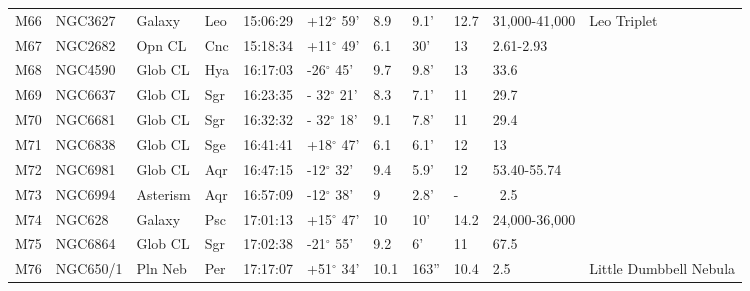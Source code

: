 \documentclass[10pt,twoside,a4paper,english]{article}
\begin{document}
\begin{longtable}{@{}lllllllllll@{}}
M66        & NGC3627     & Galaxy     & Leo       & 15:06:29 & +12$^{\circ}$ 59'  & 8.9       & 9.1'                 & 12.7     & 31,000-41,000       & Leo Triplet                               \\ 
M67        & NGC2682     & Opn CL     & Cnc       & 15:18:34 & +11$^{\circ}$ 49'  & 6.1       & 30'                  & 13       & 2.61-2.93           &                                           \\ 
M68        & NGC4590     & Glob CL    & Hya       & 16:17:03 & -26$^{\circ}$ 45'  & 9.7       & 9.8'                 & 13       & 33.6                &                                           \\ 
M69        & NGC6637     & Glob CL    & Sgr       & 16:23:35 & - 32$^{\circ}$ 21' & 8.3       & 7.1'                 & 11       & 29.7                &                                           \\ 
M70        & NGC6681     & Glob CL    & Sgr       & 16:32:32 & - 32$^{\circ}$ 18' & 9.1       & 7.8'                 & 11       & 29.4                &                                           \\ 
M71        & NGC6838     & Glob CL    & Sge       & 16:41:41 & +18$^{\circ}$ 47'  & 6.1       & 6.1'                 & 12       & 13                  &                                           \\ 
M72        & NGC6981     & Glob CL    & Aqr       & 16:47:15 & -12$^{\circ}$ 32'  & 9.4       & 5.9'                 & 12       & 53.40-55.74         &                                           \\ 
M73        & NGC6994     & Asterism   & Aqr       & 16:57:09 & -12$^{\circ}$ 38'  & 9         & 2.8'                 & -        & ~2.5                &                                           \\ 
M74        & NGC628      & Galaxy     & Psc       & 17:01:13 & +15$^{\circ}$ 47'  & 10        & 10'                  & 14.2     & 24,000-36,000       &                                           \\ 
M75        & NGC6864     & Glob CL    & Sgr       & 17:02:38 & -21$^{\circ}$ 55'  & 9.2       & 6'                   & 11       & 67.5                &                                           \\ 
M76        & NGC650/1    & Pln Neb    & Per       & 17:17:07 & +51$^{\circ}$ 34'  & 10.1      & 163''                & 10.4     & 2.5                 & Little Dumbbell Nebula                    \\ 

\end{longtable}
\end{document}
